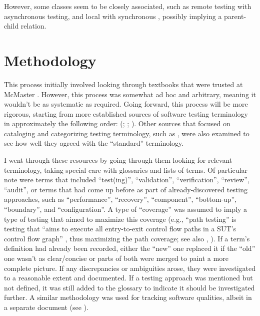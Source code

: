 However, some classes seem to be closely associated, such as remote testing
with asynchronous testing, and local with synchronous \citep{JardEtAl1999},
possibly implying a parent-child relation.

\section{Methodology}

This process initially involved looking through textbooks that were trusted at
McMaster \citep{Patton2006, PetersAndPedrycz2000, vanVliet2000}. However, this
process was somewhat ad hoc and arbitrary, meaning it wouldn't be as systematic
as required. Going forward, this process will be more rigorous, starting from
more established sources of software testing terminology in approximately the
following order:
(\citealp{IEEE2022, SWEBOK2024, SWEBOK2014, IEEE2017, IEEE2013, ISO_IEC2023b,
      IEEE2012, ISO_IEC2023a}; ; \citealp{Firesmith2015}).
Other sources that focused on cataloging and categorizing testing terminology,
such as \citet{KuļešovsEtAl2013}, were also examined to see how well they
agreed with the ``standard'' terminology.

I went through these resources by going through them looking for relevant
terminology, taking special care with glossaries and lists of terms. Of
particular note were terms that included ``test(ing)'', ``validation'',
``verification'', ``review'', ``audit'', or terms that had come up before
as part of already-discovered testing approaches, such as ``performance'',
``recovery'', ``component'', ``bottom-up'', ``boundary'', and ``configuration''.
A type of ``coverage'' was assumed to imply a type of testing that aimed to
maximize this coverage (e.g., ``path testing'' is testing that ``aims to
execute all entry-to-exit control flow paths in a SUT's control flow graph''
\citep[p.~5013]{SWEBOK2024}, thus maximizing the path coverage; see also
, \citet[Fig.~1]{SharmaEtAl2021}).
If a term's definition had already been recorded, either the ``new'' one
replaced it if the ``old'' one wasn't as clear/concise or parts of both were
merged to paint a more complete picture. If any discrepancies or ambiguities
arose, they were investigated to a reasonable extent and documented. If a
testing approach was mentioned but not defined, it was still added to the
glossary to indicate it should be investigated further. A similar methodology
was used for tracking software qualities, albeit in a separate document
(see ).

